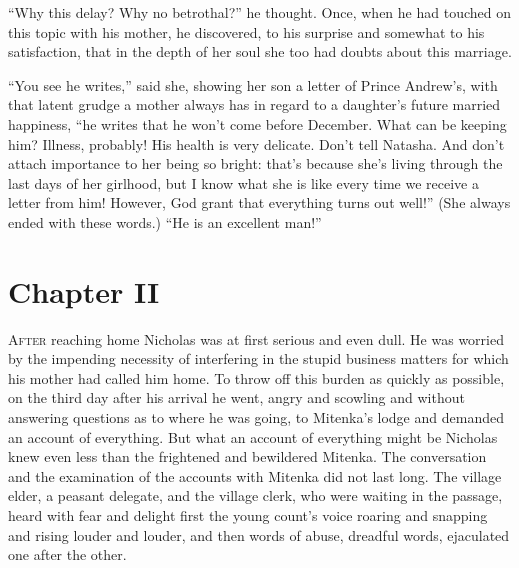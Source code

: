``Why this delay? Why no betrothal?'' he thought. Once, when he
had touched on this topic with his mother, he discovered, to his
surprise and somewhat to his satisfaction, that in the depth of
her soul she too had doubts about this marriage.

``You see he writes,'' said she, showing her son a letter of
Prince Andrew's, with that latent grudge a mother always has in
regard to a daughter's future married happiness, ``he writes that
he won't come before December. What can be keeping him? Illness,
probably! His health is very delicate. Don't tell Natasha. And
don't attach importance to her being so bright: that's because
she's living through the last days of her girlhood, but I know
what she is like every time we receive a letter from him!
However, God grant that everything turns out well!'' (She always
ended with these words.) ``He is an excellent man!''


\chapter*{Chapter II}
\ifaudio     
{} 
\fi

\lettrine[lines=2, loversize=0.3, lraise=0]{\initfamily A}{fter}
reaching home Nicholas was at first serious and even
dull. He was worried by the impending necessity of interfering in
the stupid business matters for which his mother had called him
home. To throw off this burden as quickly as possible, on the
third day after his arrival he went, angry and scowling and
without answering questions as to where he was going, to
Mitenka's lodge and demanded an account of everything. But what
an account of everything might be Nicholas knew even less than
the frightened and bewildered Mitenka. The conversation and the
examination of the accounts with Mitenka did not last long. The
village elder, a peasant delegate, and the village clerk, who
were waiting in the passage, heard with fear and delight first
the young count's voice roaring and snapping and rising louder
and louder, and then words of abuse, dreadful words, ejaculated
one after the other.

